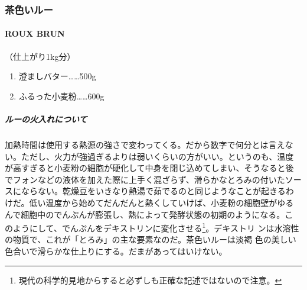 \maeaki
\begin{recette}
\hypertarget{ux8336ux8272ux3044ux30ebux30fc}{%
\subsubsection{茶色いルー}\label{ux8336ux8272ux3044ux30ebux30fc}}

\hypertarget{roux-brun}{%
\paragraph{ROUX BRUN}\label{roux-brun}}


（仕上がり1kg分）

\begin{enumerate}
\def\labelenumi{\arabic{enumi}.}
\tightlist
\item
  澄ましバター\ldots{}\ldots{}500g
\item
  ふるった小麦粉\ldots{}\ldots{}600g
\end{enumerate}

\maeaki

\hypertarget{ux30ebux30fcux306eux706bux5165ux308cux306bux3064ux3044ux3066}{%
\subparagraph{ルーの火入れについて}\label{ux30ebux30fcux306eux706bux5165ux308cux306bux3064ux3044ux3066}}


加熱時間は使用する熱源の強さで変わってくる。だから数字で何分とは言えな
い。ただし、火力が強過ぎるよりは弱いくらいの方がいい。というのも、温度
が高すぎると小麦粉の細胞が硬化して中身を閉じ込めてしまい、そうなると後
でフォンなどの液体を加えた際に上手く混ざらず、滑らかなとろみの付いたソー
スにならない。乾燥豆をいきなり熱湯で茹でるのと同じようなことが起きるわ
けだ。低い温度から始めてだんだんと熱くしていけば、小麦粉の細胞壁がゆる
んで細胞中のでんぷんが膨張し、熱によって発酵状態の初期のようになる。こ
のようにして、でんぷんをデキストリンに変化させる\footnote{現代の科学的見地からすると必ずしも正確な記述ではないので注意。}。デキストリ
ンは水溶性の物質で、これが「とろみ」の主な要素なのだ。茶色いルーは淡褐
色の美しい色合いで滑らかな仕上りにする。だまがあってはいけない。


\end{recette}
